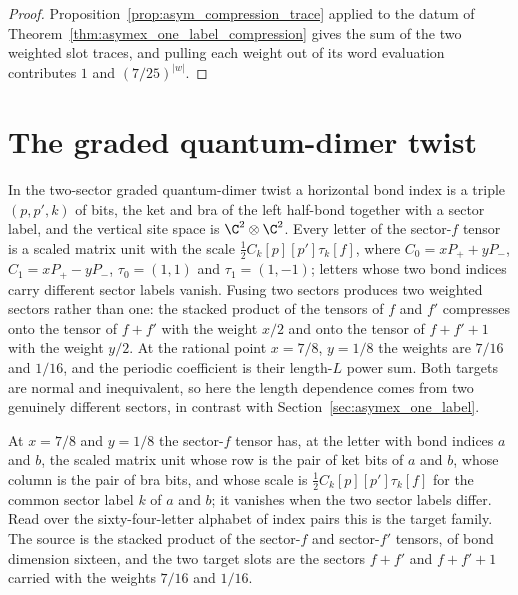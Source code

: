 \begin{proof}
    \leanok
    Proposition~\ref{prop:asym_compression_trace} applied to the datum of
    Theorem~\ref{thm:asymex_one_label_compression} gives the sum of the two
    weighted slot traces, and pulling each weight out of its word
    evaluation contributes $1$ and $(7/25)^{|w|}$.
\end{proof}

\section{The graded quantum-dimer twist}%
\label{sec:asymex_dimer}

In the two-sector graded quantum-dimer twist a horizontal bond index is a
triple $(p,p',k)$ of bits, the ket and bra of the left half-bond together
with a sector label, and the vertical site space is $\C^2\otimes\C^2$.
Every letter of the sector-$f$ tensor is a scaled matrix unit with the
scale $\tfrac12C_k[p][p']\tau_k[f]$, where $C_0=xP_++yP_-$,
$C_1=xP_+-yP_-$, $\tau_0=(1,1)$ and $\tau_1=(1,-1)$; letters whose two bond
indices carry different sector labels vanish. Fusing two sectors produces
two weighted sectors rather than one: the stacked product of the tensors of
$f$ and $f'$ compresses onto the tensor of $f+f'$ with the weight $x/2$ and
onto the tensor of $f+f'+1$ with the weight $y/2$. At the rational point
$x=7/8$, $y=1/8$ the weights are $7/16$ and $1/16$, and the periodic
coefficient is their length-$L$ power sum. Both targets are normal and
inequivalent, so here the length dependence comes from two genuinely
different sectors, in contrast with Section~\ref{sec:asymex_one_label}.

\begin{definition}
    \label{def:asymex_dimer}
    \leanok
    At $x=7/8$ and $y=1/8$ the sector-$f$ tensor has, at the letter with
    bond indices $a$ and $b$, the scaled matrix unit whose row is the pair
    of ket bits of $a$ and $b$, whose column is the pair of bra bits, and
    whose scale is $\tfrac12C_k[p][p']\tau_k[f]$ for the common sector label
    $k$ of $a$ and $b$; it vanishes when the two sector labels differ. Read
    over the sixty-four-letter alphabet of index pairs this is the target
    family. The source is the stacked product of the sector-$f$ and
    sector-$f'$ tensors, of bond dimension sixteen, and the two target slots
    are the sectors $f+f'$ and $f+f'+1$ carried with the weights $7/16$ and
    $1/16$.
\end{definition}

